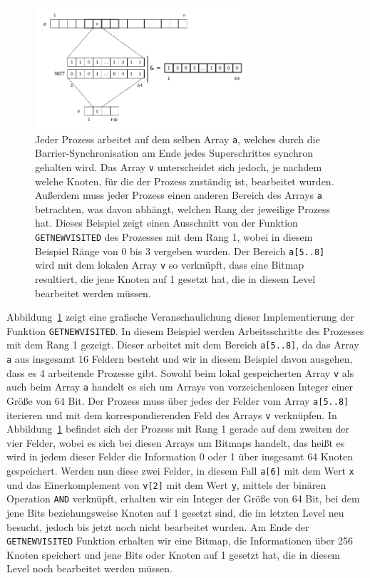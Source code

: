 \documentclass[11pt,a4paper]{article}
\begin{document}
\begin{figure}[h]
 	\centering
	\includegraphics[width=0.7\textwidth]{getnewvisited}
 	\caption{Jeder Prozess arbeitet auf dem  selben Array \lstinline{a}, welches durch die Barrier-Synchronisation am Ende jedes Superschrittes synchron gehalten wird. Das Array \lstinline{v} unterscheidet sich jedoch, je nachdem welche Knoten, für die der Prozess zuständig ist, bearbeitet wurden. Außerdem muss jeder Prozess einen anderen Bereich des Arrays \lstinline{a} betrachten, was davon abhängt, welchen Rang der jeweilige Prozess hat. Dieses Beispiel zeigt einen Ausschnitt von der Funktion \lstinline{GETNEWVISITED} des Prozesses mit dem Rang 1, wobei in diesem Beispiel Ränge von 0 bis 3 vergeben wurden. Der Bereich \lstinline{a[5..8]} wird mit dem lokalen Array \lstinline{v} so verknüpft, dass eine Bitmap resultiert, die jene Knoten auf 1 gesetzt hat, die in diesem Level bearbeitet werden müssen.}
	\label{fig:getnewvisited}
\end{figure}
Abbildung~\ref{fig:getnewvisited} zeigt eine grafische Veranschaulichung dieser Implementierung der Funktion \lstinline{GETNEWVISITED}. In diesem Beispiel werden Arbeitsschritte des Prozesses mit dem Rang 1 gezeigt. Dieser arbeitet mit dem Bereich \lstinline{a[5..8]}, da das Array \lstinline{a} aus insgesamt 16 Feldern besteht und wir in diesem Beispiel davon ausgehen, dass es 4 arbeitende Prozesse gibt. Sowohl beim lokal gespeicherten Array \lstinline{v} als auch beim Array \lstinline{a} handelt es sich um Arrays von vorzeichenlosen Integer einer Größe von 64 Bit. Der Prozess muss über jedes der Felder vom Array \lstinline{a[5..8]} iterieren und mit dem korrespondierenden Feld des Arrays \lstinline{v} verknüpfen. In Abbildung~\ref{fig:getnewvisited} befindet sich der Prozess mit Rang 1 gerade auf dem zweiten der vier Felder, wobei es sich bei diesen Arrays um Bitmaps handelt, das heißt es wird in jedem dieser Felder die Information 0 oder 1 über insgesamt 64 Knoten gespeichert. Werden nun diese zwei Felder, in diesem Fall \lstinline{a[6]} mit dem Wert \lstinline{x} und das Einerkomplement von \lstinline{v[2]} mit dem Wert \lstinline{y}, mittels der binären Operation \lstinline{AND} verknüpft, erhalten wir ein Integer der Größe von 64 Bit, bei dem jene Bits beziehungsweise Knoten auf 1 gesetzt sind, die im letzten Level neu besucht, jedoch bis jetzt noch nicht bearbeitet wurden. Am Ende der \lstinline{GETNEWVISITED} Funktion erhalten wir eine Bitmap, die Informationen über 256 Knoten speichert und jene Bits oder Knoten auf 1 gesetzt hat, die in diesem Level noch bearbeitet werden müssen.\\
\end{document}
